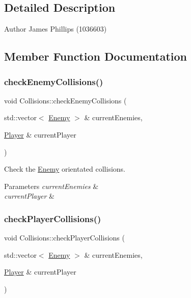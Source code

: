 \subsection{Detailed Description}
\begin{DoxyAuthor}{Author}
James Phillips (1036603) 
\end{DoxyAuthor}


\subsection{Member Function Documentation}
\mbox{\label{class_collisions_aa628e8ae15bab7e085e4962be22ff16e}} 
\subsubsection{\texorpdfstring{check\+Enemy\+Collisions()}{checkEnemyCollisions()}}
{\footnotesize\ttfamily void Collisions\+::check\+Enemy\+Collisions (\begin{DoxyParamCaption}\item[{std\+::vector$<$ \hyperlink{class_enemy}{Enemy} $>$ \&}]{current\+Enemies,  }\item[{\hyperlink{class_player}{Player} \&}]{current\+Player }\end{DoxyParamCaption})}



Check the \hyperlink{class_enemy}{Enemy} orientated collisions. 


\begin{DoxyParams}{Parameters}
{\em current\+Enemies} & \\
\hline
{\em current\+Player} & \\
\hline
\end{DoxyParams}
\mbox{\label{class_collisions_a990174c72f4771e6c2a8c014bd873513}} 
\subsubsection{\texorpdfstring{check\+Player\+Collisions()}{checkPlayerCollisions()}}
{\footnotesize\ttfamily void Collisions\+::check\+Player\+Collisions (\begin{DoxyParamCaption}\item[{std\+::vector$<$ \hyperlink{class_enemy}{Enemy} $>$ \&}]{current\+Enemies,  }\item[{\hyperlink{class_player}{Player} \&}]{current\+Player }\end{DoxyParamCaption})}



